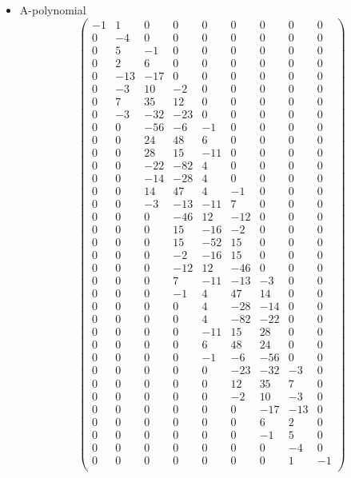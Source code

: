 \documentclass[12pt,reqno]{amsart}
\numberwithin{equation}{section}
\begin{document}
\begin{itemize}
\item A-polynomial
  \begin{equation*}
    \begin{pmatrix}
      -1 & 1 & 0 & 0 & 0 & 0 & 0 & 0 & 0 \\
      0 & -4 & 0 & 0 & 0 & 0 & 0 & 0 & 0 \\
      0 & 5 & -1 & 0 & 0 & 0 & 0 & 0 & 0 \\
      0 & 2 & 6 & 0 & 0 & 0 & 0 & 0 & 0 \\
      0 & -13 & -17 & 0 & 0 & 0 & 0 & 0 & 0 \\
      0 & -3 & 10 & -2 & 0 & 0 & 0 & 0 & 0 \\
      0 & 7 & 35 & 12 & 0 & 0 & 0 & 0 & 0 \\
      0 & -3 & -32 & -23 & 0 & 0 & 0 & 0 & 0 \\
      0 & 0 & -56 & -6 & -1 & 0 & 0 & 0 & 0 \\
      0 & 0 & 24 & 48 & 6 & 0 & 0 & 0 & 0 \\
      0 & 0 & 28 & 15 & -11 & 0 & 0 & 0 & 0 \\
      0 & 0 & -22 & -82 & 4 & 0 & 0 & 0 & 0 \\
      0 & 0 & -14 & -28 & 4 & 0 & 0 & 0 & 0 \\
      0 & 0 & 14 & 47 & 4 & -1 & 0 & 0 & 0 \\
      0 & 0 & -3 & -13 & -11 & 7 & 0 & 0 & 0 \\
      0 & 0 & 0 & -46 & 12 & -12 & 0 & 0 & 0 \\
      0 & 0 & 0 & 15 & -16 & -2 & 0 & 0 & 0 \\
      0 & 0 & 0 & 15 & -52 & 15 & 0 & 0 & 0 \\
      0 & 0 & 0 & -2 & -16 & 15 & 0 & 0 & 0 \\
      0 & 0 & 0 & -12 & 12 & -46 & 0 & 0 & 0 \\
      0 & 0 & 0 & 7 & -11 & -13 & -3 & 0 & 0 \\
      0 & 0 & 0 & -1 & 4 & 47 & 14 & 0 & 0 \\
      0 & 0 & 0 & 0 & 4 & -28 & -14 & 0 & 0 \\
      0 & 0 & 0 & 0 & 4 & -82 & -22 & 0 & 0 \\
      0 & 0 & 0 & 0 & -11 & 15 & 28 & 0 & 0 \\
      0 & 0 & 0 & 0 & 6 & 48 & 24 & 0 & 0 \\
      0 & 0 & 0 & 0 & -1 & -6 & -56 & 0 & 0 \\
      0 & 0 & 0 & 0 & 0 & -23 & -32 & -3 & 0 \\
      0 & 0 & 0 & 0 & 0 & 12 & 35 & 7 & 0 \\
      0 & 0 & 0 & 0 & 0 & -2 & 10 & -3 & 0 \\
      0 & 0 & 0 & 0 & 0 & 0 & -17 & -13 & 0 \\
      0 & 0 & 0 & 0 & 0 & 0 & 6 & 2 & 0 \\
      0 & 0 & 0 & 0 & 0 & 0 & -1 & 5 & 0 \\
      0 & 0 & 0 & 0 & 0 & 0 & 0 & -4 & 0 \\
      0 & 0 & 0 & 0 & 0 & 0 & 0 & 1 & -1 \\
    \end{pmatrix}
  \end{equation*}
\end{itemize}
\end{document}
